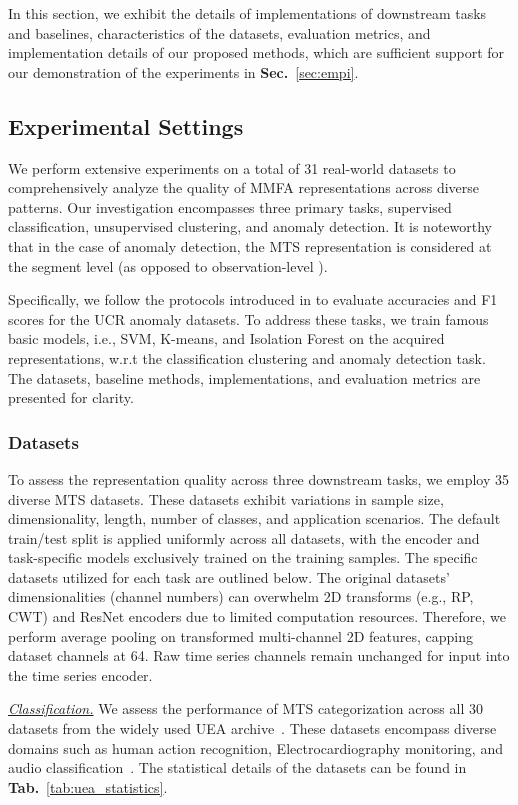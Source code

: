 In this section, we exhibit the details of implementations of downstream tasks and baselines, characteristics of the datasets, evaluation metrics, and implementation details of our proposed methods, which are sufficient support for our demonstration of the experiments in \textbf{Sec.}~\ref{sec:empi}. 


\subsection{Experimental Settings}
We perform extensive experiments on a total of 31 real-world datasets to comprehensively analyze the quality of MMFA representations across diverse patterns. Our investigation encompasses three primary tasks, supervised classification, unsupervised clustering, and anomaly detection. It is noteworthy that in the case of anomaly detection, the MTS representation is considered at the segment level (as opposed to observation-level \cite{li2021multivariate, su2019robust}). 

Specifically, we follow the protocols introduced in \cite{Wu2020CurrentTS} to evaluate accuracies and F1 scores for the UCR anomaly datasets. To address these tasks, we train famous basic models, i.e., SVM, K-means, and Isolation Forest on the acquired representations, w.r.t the classification clustering and anomaly detection task. The datasets, baseline methods, implementations, and evaluation metrics are presented for clarity.

\subsubsection{Datasets} To assess the representation quality across three downstream tasks, we employ 35 diverse MTS datasets. These datasets exhibit variations in sample size, dimensionality, length, number of classes, and application scenarios. The default train/test split is applied uniformly across all datasets, with the encoder and task-specific models exclusively trained on the training samples. The specific datasets utilized for each task are outlined below. The original datasets' dimensionalities (channel numbers) can overwhelm 2D transforms (e.g., RP, CWT) and ResNet encoders due to limited computation resources. Therefore, we perform average pooling on transformed multi-channel 2D features, capping dataset channels at 64. Raw time series channels remain unchanged for input into the time series encoder.




\textit{\underline{Classification.}} We assess the performance of MTS categorization across all 30 datasets from the widely used UEA archive~\cite{bagnall2018uea}. These datasets encompass diverse domains such as human action recognition, Electrocardiography monitoring, and audio classification~\cite{bagnall2018uea}. The statistical details of the datasets can be found in \textbf{Tab.}~\ref{tab:uea_statistics}.

